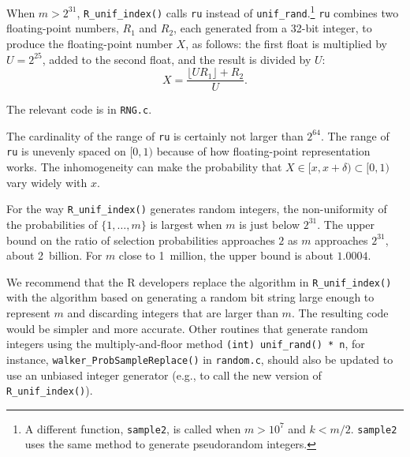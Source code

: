 \documentclass[12pt]{article}
\begin{document}
When $m > 2^{31}$, \texttt{R\_unif\_index()}
calls \texttt{ru} instead of \texttt{unif\_rand}.\footnote{
   A different function, \texttt{sample2}, is called when $m > 10^7$ and $k < m/2$.
\texttt{sample2} uses the same method to generate pseudorandom integers.
}
\texttt{ru} combines two floating-point numbers, $R_1$ and $R_2$, each generated from a 32-bit integer, 
to produce the floating-point number $X$, as follows:
the first float is multiplied by $U = 2^{25}$, added to the second float, and the result is divided by
$U$:
$$ X = \frac{\lfloor U R_1 \rfloor + R_2}{U}.$$

The relevant code is in \texttt{RNG.c}.

The cardinality of the range of \texttt{ru} is certainly not larger than $2^{64}$.
The range of \texttt{ru} is unevenly spaced on $[0, 1)$
because of how floating-point representation works.
The inhomogeneity can make the probability that $X \in [x, x+\delta) \subset [0, 1)$
vary widely with $x$.

For the way \texttt{R\_unif\_index()} generates random integers, the non-uniformity of the probabilities of 
$\{1, \ldots, m\}$ is largest when $m$ is just below $2^{31}$. 
The upper bound on the ratio of selection probabilities approaches $2$ as $m$
approaches $2^{31}$, about 2~billion. 
For $m$ close to 1~million, the upper bound is about $1.0004$.

We recommend that the R developers replace the algorithm in \texttt{R\_unif\_index()} with the algorithm based on generating a 
random bit string large enough to represent $m$ and discarding integers that are larger than $m$.
The resulting code would be simpler and more accurate. 
Other routines that generate random integers using the multiply-and-floor method \texttt{(int) unif\_rand() * n}, 
for instance, \texttt{walker\_ProbSampleReplace()} in \texttt{random.c},
should also be updated to use an unbiased integer generator (e.g., to call the new 
version of \texttt{R\_unif\_index()}).



\end{document}
